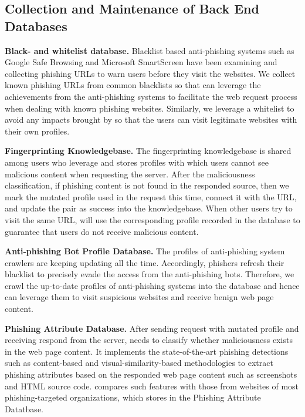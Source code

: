 \subsection{Collection and Maintenance of Back End Databases}

\noindent
\textbf{Black- and whitelist database.}
Blacklist based anti-phishing systems such as Google Safe Browsing and Microsoft SmartScreen have been examining and collecting phishing URLs to warn users before they visit the websites.
We collect known phishing URLs from common blacklists so that \spartacus can leverage the achievements from the anti-phishing systems to facilitate the web request process when dealing with known phishing websites.
Similarly, we leverage a whitelist to avoid any impacts brought by \spartacus so that the users can visit legitimate websites with their own profiles.

\noindent
\textbf{Fingerprinting Knowledgebase.}
The fingerprinting knowledgebase is shared among users who leverage \spartacus and stores profiles with which users cannot see malicious content when requesting the server.
After the maliciousness classification, if phishing content is not found in the responded source, then we mark the mutated profile used in the request this time, connect it with the URL, and update the pair as success into the knowledgebase.
When other users try to visit the same URL, \spartacus will use the corresponding profile recorded in the database to guarantee that users do not receive malicious content.

\noindent
\textbf{Anti-phishing Bot Profile Database.}
The profiles of anti-phishing system crawlers are keeping updating all the time.
Accordingly, phishers refresh their blacklist to precisely evade the access from the anti-phishing bots.
Therefore, we crawl the up-to-date profiles of anti-phishing systems into the database and hence \spartacus can leverage them to visit suspicious websites and receive benign web page content.

\noindent
\textbf{Phishing Attribute Database.}
After sending request with mutated profile and receiving respond from the server, \spartacus needs to classify whether maliciousness exists in the web page content.
It implements the state-of-the-art phishing detections such as content-based and visual-similarity-based methodologies to extract phishing attributes based on the responded web page content such as screenshots and HTML source code.
\spartacus compares such features with those from websites of most phishing-targeted organizations, which stores in the Phishing Attribute Datatbase.


